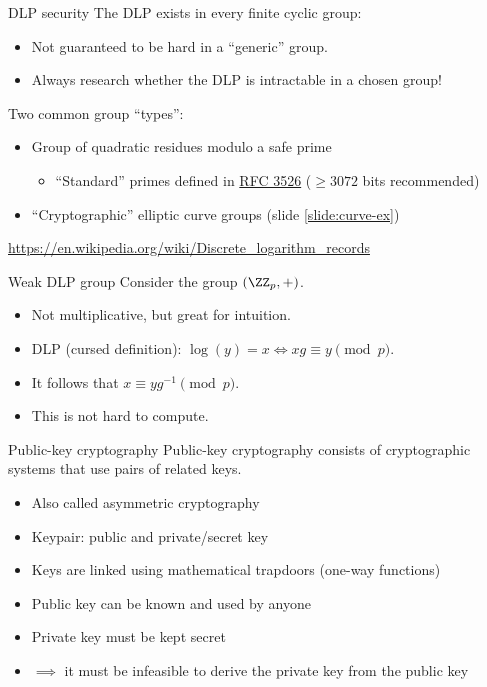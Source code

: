 \begin{frame}{DLP security}
  The DLP exists in every finite cyclic group:
  \pause
  \begin{itemize}
    \item Not guaranteed to be hard in a \enquote{generic} group.
    \item Always research whether the DLP is intractable in a chosen group!
  \end{itemize}

  \vspace*{1em}

  \pause
  Two common group \enquote{types}:
  \begin{itemize}[<+(1)->]
    \item Group of quadratic residues modulo a safe prime
    \begin{itemize}
      \item \enquote{Standard} primes defined in \href{https://datatracker.ietf.org/doc/html/rfc3526}{RFC 3526} ($\ge3072$ bits recommended)
    \end{itemize}
    \item \enquote{Cryptographic} elliptic curve groups (slide \ref{slide:curve-ex})
  \end{itemize}

  \pause
  {\scriptsize\url{https://en.wikipedia.org/wiki/Discrete_logarithm_records}}
\end{frame}

\begin{frame}{Weak DLP group}
  Consider the group $(\ZZ_p, +)$.
  \begin{itemize}[<+(1)->]
    \item Not multiplicative, but great for intuition.
    \item DLP (cursed definition): $\log(y) = x \iff xg \equiv y \pmod{p}$.
    \item It follows that $x \equiv yg^{-1} \pmod{p}$.
    \item This is not hard to compute.
  \end{itemize}
\end{frame}

\begin{frame}{Public-key cryptography}
  Public-key cryptography consists of cryptographic systems that use pairs of related keys.
  \begin{itemize}[<+(1)->]
    \item Also called asymmetric cryptography
    \item Keypair: public and private/secret key
    \item Keys are linked using mathematical trapdoors (one-way functions)
    \item Public key can be known and used by anyone
    \item Private key must be kept secret
    \item $\implies$ it must be infeasible to derive the private key from the public key
  \end{itemize}
\end{frame}

